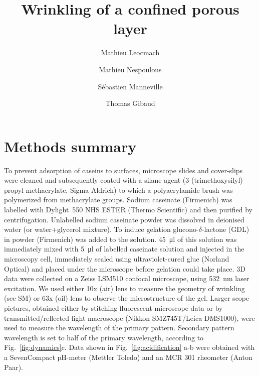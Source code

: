 \documentclass[twocolumn,superscriptaddress,showpacs,preprintnumbers,amsmath,amssymb,prl]{revtex4-1}
\begin{document}
\title{Wrinkling of a confined porous layer}
\author{Mathieu Leocmach}
\author{Mathieu Nespoulous}
\author{Sébastien Manneville}
\author{Thomas Gibaud}

\begin{abstract}

\end{abstract}

\maketitle

\section*{Methods summary}
To prevent adsorption of caseins to surfaces, microscope slides and cover-slips were cleaned and subsequently coated with a silane agent (3-(trimethoxysilyl) propyl methacrylate, Sigma Aldrich) to which a polyacrylamide brush was polymerized from methacrylate groups.
Sodium caseinate (Firmenich) was labelled with Dylight~550 NHS ESTER (Thermo Scientific) and then purified by centrifugation. Unlabelled sodium caseinate powder was dissolved in deionised water (or water+glycerol mixture). To induce gelation glucono-$\delta$-lactone (GDL) in powder (Firmenich) was added to the solution. \SI{45}{\micro\litre} of this solution was immediately mixed with \SI{5}{\micro\litre} of labelled caseinate solution and injected in the microscopy cell, immediately sealed using ultraviolet-cured glue (Norland Optical) and placed under the microscope before gelation could take place. 
3D data were collected on a Zeiss LSM510 confocal microscope, using \SI{532}{\nano\meter} laser excitation. We used either 10x (air) lens to measure the geometry of wrinkling (see SM) or 63x (oil) lens to observe the microstructure of the gel. Larger scope pictures, obtained either by stitching fluorescent microscope data or by transmitted/reflected light macroscope (Nikkon SMZ745T/Leica DMS1000), were used to measure the wavelength of the primary pattern. Secondary pattern wavelength is set to half of the primary wavelength, according to Fig.~\ref{fig:dynamics}c.
Data shown in Fig.~\ref{fig:acidification} a-b were obtained with a SevenCompact pH-meter (Mettler Toledo) and an MCR 301 rheometer (Anton Paar).
\end{document}
